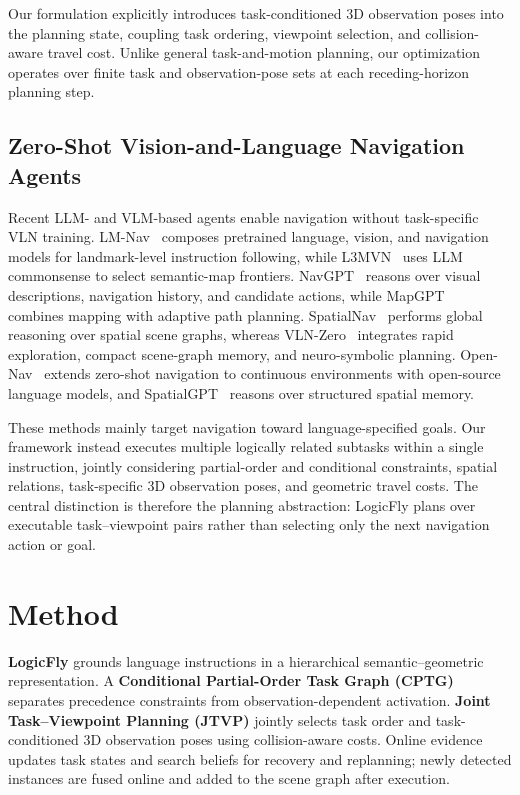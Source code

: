 \documentclass[letterpaper,10pt,conference]{ieeeconf}
\begin{document}
Our formulation explicitly introduces task-conditioned 3D observation poses into the planning state, coupling task ordering, viewpoint selection, and collision-aware travel cost. Unlike general task-and-motion planning, our optimization operates over finite task and observation-pose sets at each receding-horizon planning step.

\subsection{Zero-Shot Vision-and-Language Navigation Agents}

Recent LLM- and VLM-based agents enable navigation without task-specific VLN training. LM-Nav~\cite{shah2023lmnav} composes pretrained language, vision, and navigation models for landmark-level instruction following, while L3MVN~\cite{yu2023l3mvn} uses LLM commonsense to select semantic-map frontiers. NavGPT~\cite{zhou2024navgpt} reasons over visual descriptions, navigation history, and candidate actions, while MapGPT~\cite{chen2024mapgpt} combines mapping with adaptive path planning. SpatialNav~\cite{zhang2026spatialnav} performs global reasoning over spatial scene graphs, whereas VLN-Zero~\cite{bhatt2025vlnzero} integrates rapid exploration, compact scene-graph memory, and neuro-symbolic planning. Open-Nav~\cite{qiao2025opennav} extends zero-shot navigation to continuous environments with open-source language models, and SpatialGPT~\cite{jiang2025spatialgpt} reasons over structured spatial memory.

These methods mainly target navigation toward language-specified goals. Our framework instead executes multiple logically related subtasks within a single instruction, jointly considering partial-order and conditional constraints, spatial relations, task-specific 3D observation poses, and geometric travel costs. The central distinction is therefore the planning abstraction: LogicFly plans over executable task--viewpoint pairs rather than selecting only the next navigation action or goal.

\section{Method}

\textbf{LogicFly} grounds language instructions in a hierarchical semantic--geometric representation. A \textbf{Conditional Partial-Order Task Graph (CPTG)} separates precedence constraints from observation-dependent activation. \textbf{Joint Task--Viewpoint Planning (JTVP)} jointly selects task order and task-conditioned 3D observation poses using collision-aware costs. Online evidence updates task states and search beliefs for recovery and replanning; newly detected instances are fused online and added to the scene graph after execution.
\end{document}
